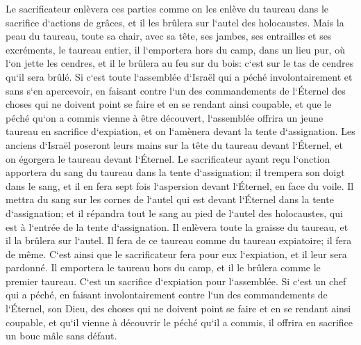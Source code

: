 \verse Le sacrificateur enlèvera ces parties comme on les enlève du taureau dans le sacrifice d`actions de grâces, et il les brûlera sur l`autel des holocaustes. 
\verse Mais la peau du taureau, toute sa chair, avec sa tête, ses jambes, ses entrailles et ses excréments, 
\verse le taureau entier, il l`emportera hors du camp, dans un lieu pur, où l`on jette les cendres, et il le brûlera au feu sur du bois: c`est sur le tas de cendres qu`il sera brûlé. 
\verse Si c`est toute l`assemblée d`Israël qui a péché involontairement et sans s`en apercevoir, en faisant contre l`un des commandements de l`Éternel des choses qui ne doivent point se faire et en se rendant ainsi coupable, 
\verse et que le péché qu`on a commis vienne à être découvert, l`assemblée offrira un jeune taureau en sacrifice d`expiation, et on l`amènera devant la tente d`assignation. 
\verse Les anciens d`Israël poseront leurs mains sur la tête du taureau devant l`Éternel, et on égorgera le taureau devant l`Éternel. 
\verse Le sacrificateur ayant reçu l`onction apportera du sang du taureau dans la tente d`assignation; 
\verse il trempera son doigt dans le sang, et il en fera sept fois l`aspersion devant l`Éternel, en face du voile. 
\verse Il mettra du sang sur les cornes de l`autel qui est devant l`Éternel dans la tente d`assignation; et il répandra tout le sang au pied de l`autel des holocaustes, qui est à l`entrée de la tente d`assignation. 
\verse Il enlèvera toute la graisse du taureau, et il la brûlera sur l`autel. 
\verse Il fera de ce taureau comme du taureau expiatoire; il fera de même. C`est ainsi que le sacrificateur fera pour eux l`expiation, et il leur sera pardonné. 
\verse Il emportera le taureau hors du camp, et il le brûlera comme le premier taureau. C`est un sacrifice d`expiation pour l`assemblée. 
\verse Si c`est un chef qui a péché, en faisant involontairement contre l`un des commandements de l`Éternel, son Dieu, des choses qui ne doivent point se faire et en se rendant ainsi coupable, 
\verse et qu`il vienne à découvrir le péché qu`il a commis, il offrira en sacrifice un bouc mâle sans défaut. 
